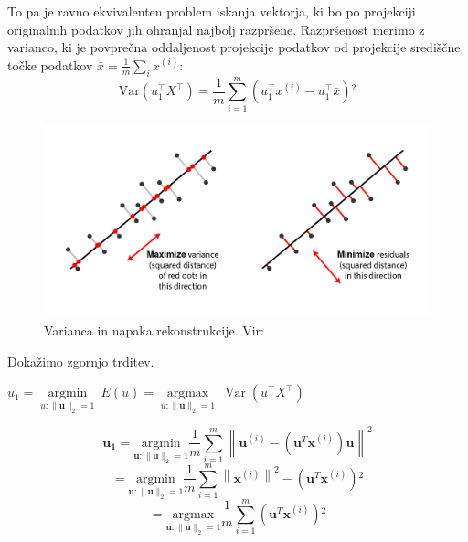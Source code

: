 To pa je ravno ekvivalenten problem iskanja vektorja, ki bo po projekciji originalnih podatkov jih ohranjal najbolj razpršene. Razpršenost merimo z varianco, ki je povprečna oddaljenost projekcije podatkov od projekcije središčne točke podatkov $\bar{x} = \frac{1}{m} \sum_{i} x^{(i)}$:
\begin{equation}
  \mathrm{Var}(u_1^{\top}X^{\top}) = \frac{1}{m} \sum_{i=1}^{m} \left(u_1^{\top}x^{(i)} - u_1^{\top}\bar{x}\right){}^2
\end{equation}
\begin{figure}[H]
  \centering
  \includegraphics[width=1\linewidth]{resources/pcaDvaPogleda.png}
  \caption{Varianca in napaka rekonstrukcije. Vir:~\cite{quora_pca_explanation}}\label{fig:varerr}
\end{figure}

Dokažimo zgornjo trditev.
\begin{trditev}
  $u_{1} = \underset{u:\|\mathbf{u}\|_2=1}{\operatorname{argmin}}\ E(u) = \underset{u:\|\mathbf{u}\|_2=1}{\operatorname{argmax}}\ \operatorname{Var}(u^{\top}X^{\top})$
\end{trditev}
\begin{dokaz}
  \begin{equation}
    \mathbf{u_{1}} = \underset{\mathbf{u}:\|\mathbf{u}\|_2=1}{\mathrm{argmin}} \frac{1}{m} \sum_{i=1}^{m} \left\| \mathbf{u}^{(i)} - (\mathbf{u}^T \mathbf{x}^{(i)})\mathbf{u} \right\|^2
  \end{equation}
  \begin{equation}
    = \underset{\mathbf{u}:\|\mathbf{u}\|_2=1}{\mathrm{argmin}} \frac{1}{m} \sum_{i=1}^{m} \left\| \mathbf{x}^{(i)} \right\|^2 - (\mathbf{u}^T \mathbf{x}^{(i)}){}^2
  \end{equation}
  \begin{equation}
    = \underset{\mathbf{u}:\|\mathbf{u}\|_2=1}{\mathrm{argmax}} \frac{1}{m} \sum_{i=1}^{m} (\mathbf{u}^T \mathbf{x}^{(i)}){}^2
  \end{equation}
\end{dokaz}~\cite{gormley2018pca} \\
